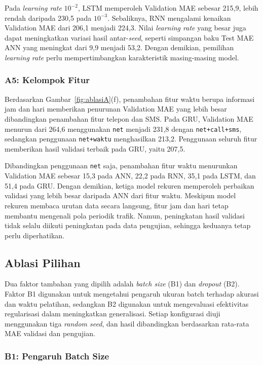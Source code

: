\documentclass[conference,a4paper]{IEEEtran}
\begin{document}
Pada \textit{learning rate} $10^{-2}$, LSTM memperoleh Validation MAE sebesar 215,9, lebih rendah daripada 230,5 pada $10^{-3}$. Sebaliknya, RNN mengalami kenaikan Validation MAE dari 206,1 menjadi 224,3. Nilai \textit{learning rate} yang besar juga dapat meningkatkan variasi hasil antar-\textit{seed}, seperti simpangan baku Test MAE ANN yang meningkat dari 9,9 menjadi 53,2. Dengan demikian, pemilihan \textit{learning rate} perlu mempertimbangkan karakteristik masing-masing model.

\subsubsection{A5: Kelompok Fitur}

Berdasarkan Gambar~\ref{fig:ablasiA}(f), penambahan fitur waktu berupa informasi jam dan hari memberikan penurunan Validation MAE yang lebih besar dibandingkan penambahan fitur telepon dan SMS. Pada GRU, Validation MAE menurun dari 264,6 menggunakan \texttt{net} menjadi 231,8 dengan \texttt{net+call+sms}, sedangkan penggunaan \texttt{net+waktu} menghasilkan 213,2. Penggunaan seluruh fitur memberikan hasil validasi terbaik pada GRU, yaitu 207,5.

Dibandingkan penggunaan \texttt{net} saja, penambahan fitur waktu menurunkan Validation MAE sebesar 15,3 pada ANN, 22,2 pada RNN, 35,1 pada LSTM, dan 51,4 pada GRU. Dengan demikian, ketiga model rekuren memperoleh perbaikan validasi yang lebih besar daripada ANN dari fitur waktu. Meskipun model rekuren membaca urutan data secara langsung, fitur jam dan hari tetap membantu mengenali pola periodik trafik. Namun, peningkatan hasil validasi tidak selalu diikuti peningkatan pada data pengujian, sehingga keduanya tetap perlu diperhatikan.


\FloatBarrier
\subsection{Ablasi Pilihan}

Dua faktor tambahan yang dipilih adalah \textit{batch size} (B1) dan \textit{dropout} (B2). Faktor B1 digunakan untuk mengetahui pengaruh ukuran batch terhadap akurasi dan waktu pelatihan, sedangkan B2 digunakan untuk mengevaluasi efektivitas regularisasi dalam meningkatkan generalisasi. Setiap konfigurasi diuji menggunakan tiga \textit{random seed}, dan hasil dibandingkan berdasarkan rata-rata MAE validasi dan pengujian.

\subsubsection{B1: Pengaruh Batch Size}
\end{document}
